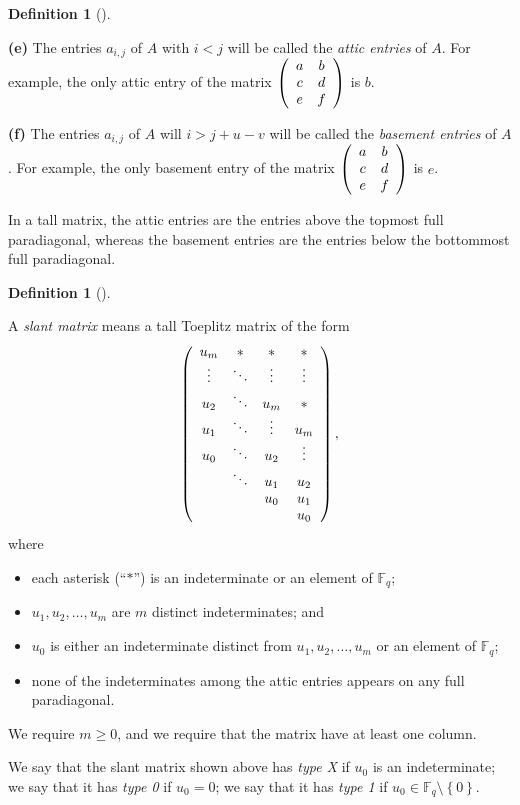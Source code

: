 \documentclass[numbers=enddot,12pt,final,onecolumn,notitlepage]{scrartcl}%
\theoremstyle{definition}
\newtheorem{defi}[theo]{Definition}
\newenvironment{definition}[1][]
{\begin{defi}[#1]\begin{leftbar}}
{\end{leftbar}\end{defi}}
\newcommand{\Fq}{\mathbb{F}_q}
\renewcommand{\geq}{\geqslant}
\theoremstyle{plainsl}
\begin{document}
\begin{definition}
\textbf{(e)} The entries $a_{i,j}$ of $A$ with $i<j$ will be called the
\emph{attic entries} of $A$. For example, the only attic entry of the matrix
$\left(
\begin{array}
[c]{cc}%
a & b\\
c & d\\
e & f
\end{array}
\right)  $ is $b$.

\textbf{(f)} The entries $a_{i,j}$ of $A$ will $i>j+u-v$ will be called the
\emph{basement entries} of $A$. For example, the only basement entry of the
matrix $\left(
\begin{array}
[c]{cc}%
a & b\\
c & d\\
e & f
\end{array}
\right)  $ is $e$.
\end{definition}

In a tall matrix, the attic entries are the entries above the topmost
full paradiagonal, whereas the basement entries are the entries below
the bottommost full paradiagonal.

\begin{definition}
\label{def.slant} A \emph{slant matrix} means a tall Toeplitz matrix of the
form%
\[
\left(
\begin{array}
[c]{cccc}%
u_{m} & \ast & \ast & \ast\\
\vdots & \ddots & \vdots & \vdots\\
u_{2} & \ddots & u_{m} & \ast\\
u_{1} & \ddots & \vdots & u_{m}\\
u_{0} & \ddots & u_{2} & \vdots\\
& \ddots & u_{1} & u_{2}\\
&  & u_{0} & u_{1}\\
&  &  & u_{0}%
\end{array}
\right)  ,
\]
where

\begin{itemize}
\item each asterisk (``$\ast$'') is an indeterminate or an element of $\Fq$;

\item $u_{1},u_{2},\ldots,u_{m}$ are $m$ distinct indeterminates; and

\item $u_{0}$ is either an indeterminate distinct from $u_{1},u_{2}%
,\ldots,u_{m}$ or an element of $\Fq$;

\item none of the indeterminates among the attic entries appears on any
full paradiagonal.
\end{itemize}

We require $m\geq0$, and we require that the matrix have at least one column.

We say that the slant matrix shown above has \emph{type X} if $u_{0}$ is an
indeterminate; we say that it has \emph{type 0} if $u_{0}=0$; we say that it
has \emph{type 1} if $u_{0}\in \Fq\setminus\left\{  0\right\}  $.
\end{definition}
\end{document}
